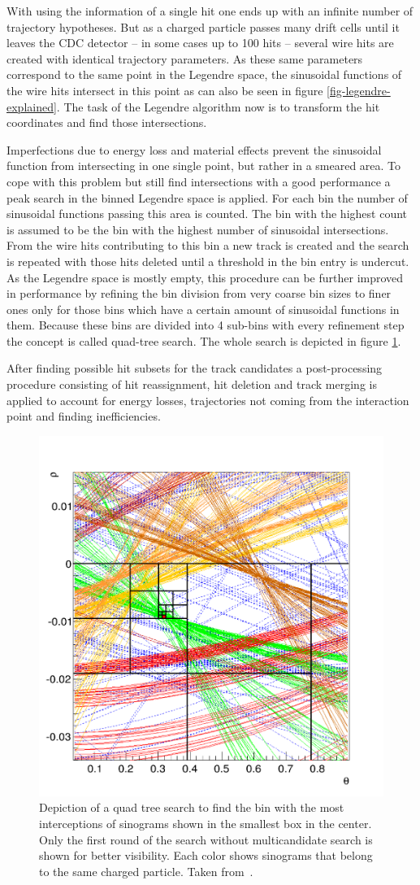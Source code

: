 With using the information of a single hit one ends up with an infinite number of trajectory hypotheses. But as a charged particle passes many drift cells until it leaves the CDC detector -- in some cases up to 100 hits -- several wire hits are created with identical trajectory parameters. As these same parameters correspond to the same point in the Legendre space, the sinusoidal functions of the wire hits intersect in this point as can also be seen in figure \ref{fig-legendre-explained}. The task of the Legendre algorithm now is to transform the hit coordinates and find those intersections.

Imperfections due to energy loss and material effects prevent the sinusoidal function from intersecting in one single point, but rather in a smeared area. To cope with this problem but still find intersections with a good performance a peak search in the binned Legendre space is applied. For each bin the number of sinusoidal functions passing this area is counted. The bin with the highest count is assumed to be the bin with the highest number of sinusoidal intersections. From the wire hits contributing to this bin a new track is created and the search is repeated with those hits deleted until a threshold in the bin entry is undercut. As the Legendre space is mostly empty, this procedure can be further improved in performance by refining the bin division from very coarse bin sizes to finer ones only for those bins which have a certain amount of sinusoidal functions in them. Because these bins are divided into 4 sub-bins with every refinement step the concept is called quad-tree search. The whole search is depicted in figure \ref{fig-quad-tree-search}.

After finding possible hit subsets for the track candidates a post-processing procedure consisting of hit reassignment, hit deletion and track merging is applied to account for energy losses, trajectories not coming from the interaction point and finding inefficiencies.

\begin{figure}
  \centering
  \includegraphics[width=0.5\linewidth]{figures/theory/quad_tree.png}
  \caption[Quad tree search.]{Depiction of a quad tree search to find the bin with the most interceptions of sinograms shown in the smallest box in the center. Only the first round of the search without multicandidate search is shown for better visibility. Each color shows sinograms that belong to the same charged particle. Taken from~\cite{viktor_dpg}.}
  \label{fig-quad-tree-search}
\end{figure}


